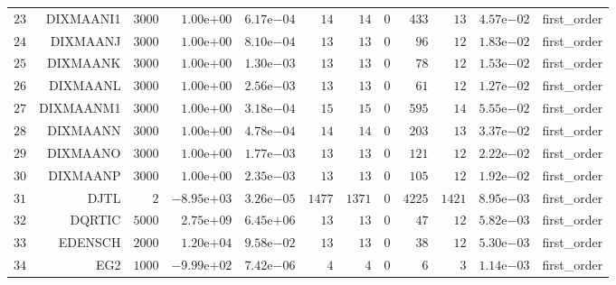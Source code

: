 \begin{longtable}{rrrrrrrrrrrr}
  \(    23\) & DIXMAANI1 & \(  3000\) & \( 1.00\)e\(+00\) & \( 6.17\)e\(-04\) & \(    14\) & \(    14\) & \(     0\) & \(   433\) & \(    13\) & \( 4.57\)e\(-02\) & first\_order \\
  \(    24\) & DIXMAANJ & \(  3000\) & \( 1.00\)e\(+00\) & \( 8.10\)e\(-04\) & \(    13\) & \(    13\) & \(     0\) & \(    96\) & \(    12\) & \( 1.83\)e\(-02\) & first\_order \\
  \(    25\) & DIXMAANK & \(  3000\) & \( 1.00\)e\(+00\) & \( 1.30\)e\(-03\) & \(    13\) & \(    13\) & \(     0\) & \(    78\) & \(    12\) & \( 1.53\)e\(-02\) & first\_order \\
  \(    26\) & DIXMAANL & \(  3000\) & \( 1.00\)e\(+00\) & \( 2.56\)e\(-03\) & \(    13\) & \(    13\) & \(     0\) & \(    61\) & \(    12\) & \( 1.27\)e\(-02\) & first\_order \\
  \(    27\) & DIXMAANM1 & \(  3000\) & \( 1.00\)e\(+00\) & \( 3.18\)e\(-04\) & \(    15\) & \(    15\) & \(     0\) & \(   595\) & \(    14\) & \( 5.55\)e\(-02\) & first\_order \\
  \(    28\) & DIXMAANN & \(  3000\) & \( 1.00\)e\(+00\) & \( 4.78\)e\(-04\) & \(    14\) & \(    14\) & \(     0\) & \(   203\) & \(    13\) & \( 3.37\)e\(-02\) & first\_order \\
  \(    29\) & DIXMAANO & \(  3000\) & \( 1.00\)e\(+00\) & \( 1.77\)e\(-03\) & \(    13\) & \(    13\) & \(     0\) & \(   121\) & \(    12\) & \( 2.22\)e\(-02\) & first\_order \\
  \(    30\) & DIXMAANP & \(  3000\) & \( 1.00\)e\(+00\) & \( 2.35\)e\(-03\) & \(    13\) & \(    13\) & \(     0\) & \(   105\) & \(    12\) & \( 1.92\)e\(-02\) & first\_order \\
  \(    31\) & DJTL & \(     2\) & \(-8.95\)e\(+03\) & \( 3.26\)e\(-05\) & \(  1477\) & \(  1371\) & \(     0\) & \(  4225\) & \(  1421\) & \( 8.95\)e\(-03\) & first\_order \\
  \(    32\) & DQRTIC & \(  5000\) & \( 2.75\)e\(+09\) & \( 6.45\)e\(+06\) & \(    13\) & \(    13\) & \(     0\) & \(    47\) & \(    12\) & \( 5.82\)e\(-03\) & first\_order \\
  \(    33\) & EDENSCH & \(  2000\) & \( 1.20\)e\(+04\) & \( 9.58\)e\(-02\) & \(    13\) & \(    13\) & \(     0\) & \(    38\) & \(    12\) & \( 5.30\)e\(-03\) & first\_order \\
  \(    34\) & EG2 & \(  1000\) & \(-9.99\)e\(+02\) & \( 7.42\)e\(-06\) & \(     4\) & \(     4\) & \(     0\) & \(     6\) & \(     3\) & \( 1.14\)e\(-03\) & first\_order \\

\end{longtable}
